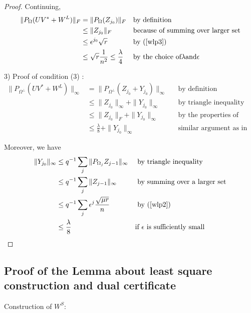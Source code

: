 \begin{proof}
Continuing,
\begin{align*}
\|P_{\Omega}(UV^{*}+W^{L})\|_{F} 
& = \|P_{\Omega}(Z_{j_{0}})\|_{F} 
&&\text{by definition}\\
& \le \|Z_{j_{0}}\|_{F} 
&&\text{because of summing over larger set} \\
& \le \epsilon^{j_{0}} \sqrt{r} 
&&\text{by (\ref{wlp3})} \\
& \le \sqrt{r}\frac{1}{n^{2}} \le \frac{\lambda}{4} 
&&\text{by the choice of} \lambda \text{and} \epsilon
\end{align*}


3) Proof of condition (3) :
\begin{align*}
\|P_{\Omega^{\bot}}(UV^{*}+W^{L})\|_{\infty} 
& = \|P_{\Omega^{\bot}}(Z_{j_{0}}+Y_{j_{0}})\|_{\infty}
&&\text{by definition}\\
& \le \|Z_{j_{0}}\|_{\infty} + \|Y_{j_{0}}\|_{\infty} 
&&\text{by triangle inequality and summing over larger set}\\
& \le \|Z_{j_{0}}\|_{F} + \|Y_{j_{0}}\|_{\infty} 
&&\text{by the properties of Frobenius and infinite norms}\\
& \le \frac{\lambda}{8} + \|Y_{j_{0}}\|_{\infty} 
&&\text{similar argument as in Proof of condition (2)}
\end{align*}


Moreover, we have
\[
\begin{aligned}
\|Y_{j_{0}}\|_{\infty} 
& \le q^{-1}\sum_{j}\|P_{\Omega_{j}}Z_{j-1}\|_{\infty} 
&&\text{ by triangle inequality}\\
& \le q^{-1}\sum_{j}\|Z_{j-1}\|_{\infty} 
&&\text{ by summing over a larger set}\\
& \le q^{-1}\sum_{j}\epsilon^{j}\frac{\sqrt{\mu r}}{n} 
&&\text{ by (\ref{wlp2})}\\
& \le \frac{\lambda}{8}
&&\text{if } \epsilon \text{ is sufficiently small}
\end{aligned}
\]

\end{proof}


\subsection{Proof of the Lemma about least square construction and dual certificate }

Construction of $W^{S}$:

